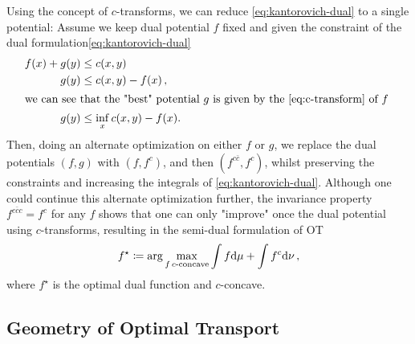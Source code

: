 Using the concept of $c$-transforms, we can reduce \eqref{eq:kantorovich-dual} to a single potential: Assume we keep dual potential $f$ fixed and given the constraint of the dual formulation\eqref{eq:kantorovich-dual}
\begin{align*}
  f(x)+g(y) & \leq c(x, y) \\
  g(y) & \leq c(x, y)-f(x)\,, \\
  \intertext{we can see that the "best" potential $g$ is given by the \cref{eq:c-transform} of $f$ }
  \label{eq:best_g} g(y) & \leq \inf _x c(x, y)-f(x).
\end{align*} 
Then, doing an alternate optimization on either $f$ or $g$, we replace the dual potentials $(f, g)$ with $(f, f^c)$, and then $(f^{c\bar{c}}, f^c)$, whilst preserving the constraints and increasing the integrals of \eqref{eq:kantorovich-dual}.  
Although one could continue this alternate optimization further, the invariance property $f^{c\bar{c}c} = f^c$ for any $f$ shows that one can only "improve" once the dual potential using $c$-transforms, resulting in the semi-dual formulation of \acrlong{OT}
\begin{equation} \label{eq:semi-dual}
  f^\star \coloneqq \arg\max_{f\, c\text{-concave}} \int f \textrm{d}\mu + \int f^c\textrm{d}\nu\,,
\end{equation}
where $f^\star$ is the optimal dual function and $c$-concave.
\subsection{Geometry of Optimal Transport}

